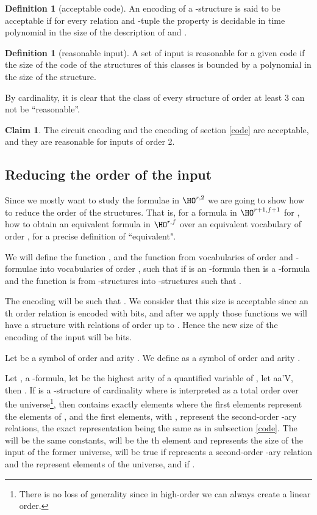 \documentclass[a4paper,12pt]{article}
\theoremstyle{definition}
\newtheorem{definition}[theorem]{Definition}
\newtheorem{claim}[theorem]{Claim}
\renewcommand{\phi}{\varphi}
\newcommand{\hod}[2]{\ensuremath{\HO^{#1,#2}}}
\begin{document}
\begin{definition}[acceptable code]
  An encoding of a -structure  is said to be
  acceptable if for every relation  and -tuple  the property  is decidable in time
  polynomial in the size of the description of  and .
\end{definition}


\begin{definition}[reasonable input]\label{reasonable}
  A set of input is reasonable for a given code if the size of the
  code of the structures of this classes is bounded by a polynomial in
  the size of the structure.
\end{definition}
By cardinality, it is clear that the class of every structure of order
at least 3 can not be ``reasonable''.

\begin{claim}
  The circuit encoding and the encoding of section \ref{code} are
  acceptable, and they are reasonable for inputs of order 2.
\end{claim}

\subsection{Reducing the order of the input}
Since we mostly want to study the formulae in \hod r2 we are going to
show how to reduce the order of the structures. That is, for a formula
in \hod {r+1}{f+1} for , how to obtain an equivalent formula in
\hod {r}{f} over an equivalent vocabulary of order , for a precise
definition of ``equivalent".

We will define the function ,
and the function  from vocabularies  of order  and
-formulae into vocabularies of order , such that if 
is an -formula then  is a -formula and the
function  is from -structures into -structures such
that .

The encoding will be such that . We
consider that this size is acceptable since an th order relation is
encoded with  bits, and after we apply those
functions we will have a structure with relations of order up to
.  Hence the new size of the encoding of the input will be
 bits.

Let  be a symbol of order  and arity . We define
 as a symbol of order  and arity .

Let ,  a -formula, let  be the
highest arity of a quantified variable of , let
aa'V\phi, then
. If  is a -structure of
cardinality  where  is interpreted as a total order over the
universe\footnote{There is no loss of generality since in high-order
  we can always create a linear order.}, then  contains exactly
 elements where the first  elements represent the 
elements of , and the first  elements, with , represent the second-order -ary relations, the exact
representation being the same as in subsection \ref{code}. The 
will be the same constants,  will be the th element and represents
the size of the input of the former universe,
 will be true if 
represents a second-order -ary relation  and the
 represent elements of the universe, and if
. 
\end{document}
